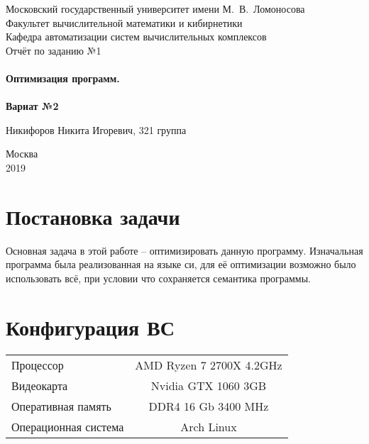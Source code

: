 \documentclass[a4peper, 12pt, titlepage, finall]{extreport}
\begin{document}
    \begin{titlepage}
        \begin{center}
            {\small \sc Московский государственный университет имени М.~В.~Ломоносова\\
            Факультет вычислительной математики и кибирнетики\\
            Кафедра автоматизации систем вычислительных комплексов\\}
            \vfill
            {\large \sc Отчёт по заданию №1}\\~\\

            {\large \bf Оптимизация программ.}\\~\\

            {\large \bf Вариат №2}
        \end{center}
        
        \begin{flushright}
            \vfill
            {Никифоров Никита Игоревич, 321 группа}
        \end{flushright}

        \begin{center}
            \vfill
            {\small Москва\\2019}
        \end{center}
    \end{titlepage}

    \tableofcontents
    \newpage

    \section{Постановка задачи}
        Основная задача в этой работе -- оптимизировать данную программу. Изначальная программа была реализованная на языке си, для её оптимизации возможно было использовать всё, при условии что сохраняется семантика программы.

    \section{Конфигурация ВС}
        \begin{tabular}{lc}
            Процессор & AMD Ryzen 7 2700X 4.2GHz\\
            Видеокарта & Nvidia GTX 1060 3GB\\
            Оперативная память & DDR4 16 Gb 3400 MHz\\
            Операционная система & Arch Linux \\
        \end{tabular}
\end{document}
